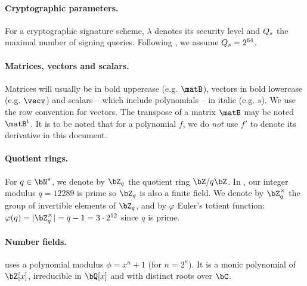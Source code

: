 \paragraph{Cryptographic parameters.} For a cryptographic signature scheme, $\lambda$ denotes its security level and $Q_s$ the maximal number of signing queries. Following \cite{NIST}, we assume $Q_s = 2^{64}$.

\paragraph{Matrices, vectors and scalars.} Matrices will usually be in bold uppercase (e.g. $\matB$), vectors in bold lowercase (e.g. $\vecv$) and scalars -- which include polynomials -- in italic (e.g. $s$). We use the row convention for vectors. The transpose of a matrix $\matB$ may be noted $\matB^\t$. It is to be noted that for a polynomial $f$, we do \emph{not} use $f'$ to denote its derivative in this document.

\paragraph{Quotient rings.} For $q \in \bN^\star$, we denote by $\bZ_q$ the quotient ring $\bZ/q\bZ$. In \falcon, our integer modulus $q = 12289$ is prime so $\bZ_q$ is also a finite field. We denote by $\bZ_q^\times$ the group of invertible elements of $\bZ_q$, and by $\varphi$ Euler's totient function: $\varphi(q) = |\bZ_q^\times| = q - 1 = 3 \cdot 2^{12}$ since $q$ is prime.


\paragraph{Number fields.} \falcon uses a polynomial modulus $\phi = x^n+1$ (for $n = 2^\kappa$). It is a monic polynomial of $\bZ[x]$, irreducible in $\bQ[x]$ and with distinct roots over $\bC$.

